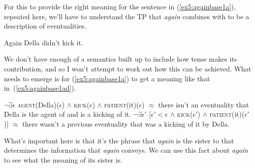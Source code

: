 For this to provide the right meaning for the sentence in (\ref{ex5:againbase1a}), repeated here, we'll have to understand the TP that \emph{again} combines with to be a description of eventualities. 
\begin{exe}
	\raggedright
	 Again Della didn't kick it.
\end{exe}
We don't have enough of a semantics built up to include how tense makes its contribution, and so I won't attempt to work out how this can be achieved. What needs to emerge is for (\ref{ex5:againbase1a}) to get a meaning like that in~(\ref{ex5:againbase1ad}).
\begin{exe}
	\raggedright
	\ex \label{ex5:againbase1ad} 
	\begin{xlist}
		\ex $\neg \exists \epsilon$ \textsc{agent}(Della)($\epsilon$) $\wedge$ \textsc{kick}($\epsilon$) $\wedge$ \textsc{patient}(it)($\epsilon$)
		\sn $\approx$ there isn't an eventuality that Della is the agent of and is a kicking of it.
		\ex $\neg \exists \epsilon '$ [$\epsilon ' < \epsilon$ $\wedge$ \textsc{kick}($\epsilon '$) $\wedge$ \textsc{patient}(it)($\epsilon '$)]
		\sn $\approx$ there wasn't a previous eventuality that was a kicking of it by Della.
	\end{xlist}
\end{exe}
What's important here is that it's the phrase that \emph{again} is the sister to that determines the information that \emph{again} conveys. We can use this fact about \emph{again} to see what the meaning of its sister is.

